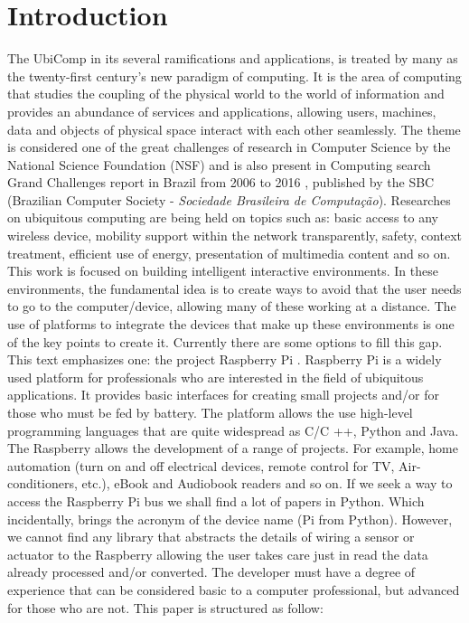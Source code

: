 \documentclass{acm_proc_article-sp}
\begin{document}
\section*{Introduction}
The UbiComp in its several ramifications and applications, is treated by many as the twenty-first century's new paradigm of computing. It is the area of computing that studies the coupling of the physical world to the world of information and provides an abundance of services and applications, allowing users, machines, data and objects of physical space interact with each other seamlessly. The theme is considered one of the great challenges of research in Computer Science by the National Science Foundation (NSF)\cite{NSF} and is also present in Computing search Grand Challenges report in Brazil from 2006 to 2016 \cite{carvalho2006grandes}, published by the SBC (Brazilian Computer Society - \textit{Sociedade Brasileira de Computa{\c{c}}{\~a}o}).
\newline
\newline
Researches on ubiquitous computing are being held on topics such as: basic access to any wireless device, mobility support within the network transparently, safety, context treatment, efficient use of energy, presentation of multimedia content and so on. This work is focused on building intelligent interactive environments. In these environments, the fundamental idea is to create ways to avoid that the user needs to go to the computer/device, allowing many of these working at a distance. The use of platforms to integrate the devices that make up these environments is one of the key points to create it. Currently there are some options to fill this gap. This text emphasizes one: the project Raspberry Pi \cite{Trapp,wirth2014making}.
\newline
\newline
Raspberry Pi is a widely used platform for professionals who are interested in the field of ubiquitous applications. It provides basic interfaces for creating small projects and/or for those who must be fed by battery. The platform allows the use high-level programming languages that are quite widespread as C/C ++, Python and Java. The Raspberry allows the development of a range of projects. For example, home automation (turn on and off electrical devices, remote control for TV, Air-conditioners, etc.), eBook and Audiobook readers and so on.
\newline
\newline
If we seek a way to access the Raspberry Pi bus we shall find a lot of papers in Python. Which incidentally, brings the acronym of the device name (Pi from Python). However, we cannot find any library that abstracts the details of wiring a sensor or actuator to the Raspberry allowing the user takes care just in read the data already processed and/or converted.
\newline
\newline
The developer must have a degree of experience that can be considered basic to a computer professional, but advanced for those who are not.
\newline
\newline 
This paper is structured as follow:
\end{document}
